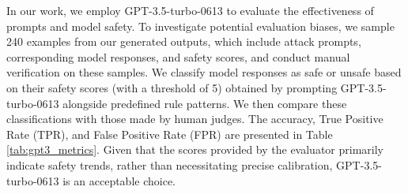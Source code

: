 In our work, we employ GPT-3.5-turbo-0613 to evaluate the effectiveness of prompts and model safety. 
To investigate potential evaluation biases, we sample 240 examples from our generated outputs, which include attack prompts, corresponding model responses, and safety scores, and conduct manual verification on these samples.
We classify model responses as safe or unsafe based on their safety scores (with a threshold of 5) obtained by prompting GPT-3.5-turbo-0613 alongside predefined rule patterns. We then compare these classifications with those made by human judges.
The accuracy, True Positive Rate (TPR), and False Positive Rate (FPR) are presented in Table \ref{tab:gpt3_metrics}. 
Given that the scores provided by the evaluator primarily indicate safety trends, rather than necessitating precise calibration, GPT-3.5-turbo-0613 is an acceptable choice.


\begin{table}[!t]
\centering
{}
\caption{Performance for GPT-3.5-turbo-0613 as a evaluator.}
\label{tab:gpt3_metrics}
\end{table}





